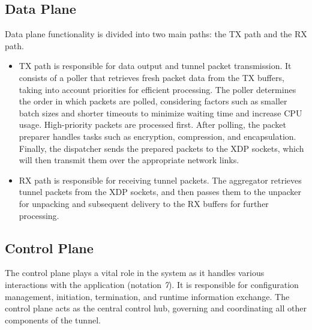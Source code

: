 \subsection{Data Plane}
Data plane functionality is divided into two main paths: the TX path and the RX path.
\begin{itemize}
	\item TX path is responsible for data output and tunnel packet transmission. It consists of a poller that retrieves fresh packet data from the TX buffers, taking into account priorities for efficient processing. The poller determines the order in which packets are polled, considering factors such as smaller batch sizes and shorter timeouts to minimize waiting time and increase CPU usage. High-priority packets are processed first. After polling, the packet preparer handles tasks such as encryption, compression, and encapsulation. Finally, the dispatcher sends the prepared packets to the XDP sockets, which will then transmit them over the appropriate network links.
	\item RX path is responsible for receiving tunnel packets. The aggregator retrieves tunnel packets from the XDP sockets, and then passes them to the unpacker for unpacking and subsequent delivery to the RX buffers for further processing.
\end{itemize}

\subsection{Control Plane}
The control plane plays a vital role in the system as it handles various interactions with the application (notation \textit{7}). 
It is responsible for configuration management, initiation, termination, and runtime information exchange. 
The control plane acts as the central control hub, governing and coordinating all other components of the tunnel.
